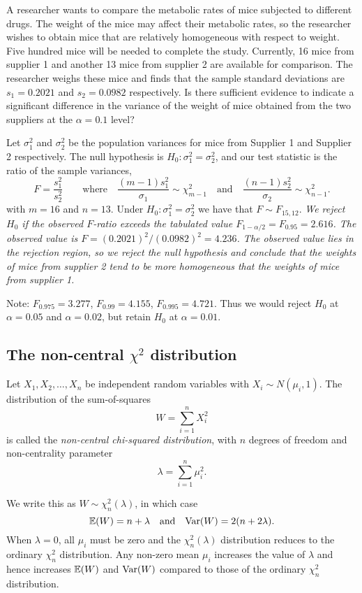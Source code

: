 \begin{example}
A researcher wants to compare the metabolic rates of mice subjected to different drugs. The weight of the mice may affect their metabolic rates, so the researcher wishes to obtain mice that are relatively homogeneous with respect to weight. Five hundred mice will be needed to complete the study. Currently, 16 mice from supplier 1 and another 13 mice from supplier 2 are available for comparison. The researcher weighs these mice and finds that the sample standard deviations are $s_1=0.2021$ and $s_2=0.0982$ respectively. Is there sufficient evidence to indicate a significant difference in the variance of the weight of mice obtained from the two suppliers at the $\alpha=0.1$ level?
\begin{solution}
Let $\sigma^2_1$ and $\sigma^2_2$ be the population variances for mice from Supplier 1 and Supplier 2 respectively. The null hypothesis is $H_0:\sigma^2_1=\sigma^2_2$, and our test statistic is the ratio of the sample variances,
\[
F = \frac{s^2_1}{s^2_2}
\qquad\text{where}\quad 
\frac{(m-1)s^2_1}{\sigma_1}\sim\chi^2_{m-1}
\quad\text{and}\quad 
\frac{(n-1)s^2_2}{\sigma_2}\sim\chi^2_{n-1}.
\]
with $m=16$ and $n=13$. Under $H_0:\sigma^2_1=\sigma^2_2$ we have that $F\sim F_{15,12}$.
\bit
\it We reject $H_0$ if the observed $F$-ratio exceeds the tabulated value $F_{1-\alpha/2}=F_{0.95} = 2.616$.
\it The observed value is $F=(0.2021)^2/(0.0982)^2=4.236$.
\eit
The observed value lies in the rejection region, so we reject the null hypothesis and conclude that the weights of mice from supplier 2 tend to be more homogeneous that the weights of mice from supplier 1.

\bigskip
Note: $F_{0.975} = 3.277$, $F_{0.99} = 4.155$,  $F_{0.995} = 4.721$. Thus we would reject $H_0$ at $\alpha=0.05$ and $\alpha=0.02$, but retain $H_0$ at $\alpha=0.01$.
\end{solution}
\end{example}

\subsection{The non-central $\chi^2$ distribution}

\begin{definition}
Let $X_1,X_2,\ldots,X_n$ be independent random variables with $X_i\sim N(\mu_i,1)$. The distribution of the sum-of-squares
\[
W=\sum_{i=1}^n X_i^2
\]
is called the \emph{non-central chi-squared distribution}, with $n$ degrees of freedom and non-centrality parameter 
\[
\lambda = \sum_{i=1}^n \mu_i^2.
\]
\end{definition}
We write this as $W\sim\chi^2_n(\lambda)$, in which case
\[
\mathbb{E}(W)=n+\lambda \quad\text{and}\quad \text{Var}(W)=2(n+2\lambda).
\]
When $\lambda=0$, all $\mu_i$ must be zero and the $\chi^2_n(\lambda)$ distribution reduces to the ordinary $\chi^2_n$ distribution. Any non-zero mean $\mu_i$ increases the value of $\lambda$ and hence increases $\mathbb{E}(W)$ and $\text{Var}(W)$ compared to those of the ordinary $\chi^2_n$ distribution. 


